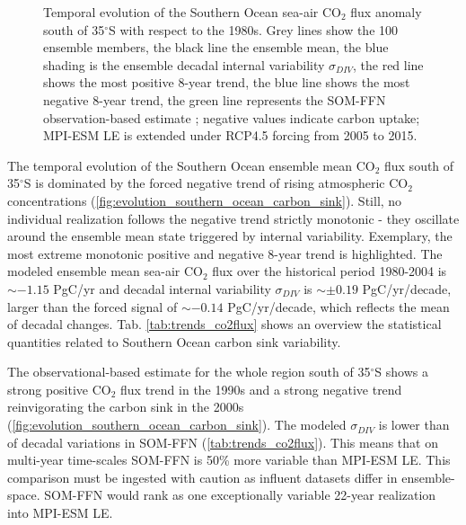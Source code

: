 \clearpage
\begin{figure}[hbt]
        \myfloatalign
        \captionsetup[subfigure]{labelformat=empty,justification=centering}
        \caption{Temporal evolution of the Southern Ocean sea-air CO$_2$ flux anomaly south of 35$^\circ$S with respect to the 1980s. Grey lines show the 100 ensemble members, the black line the ensemble mean, the blue shading is the ensemble decadal internal variability $\sigma_{DIV}$, the red line shows the most  positive 8-year trend, the blue line shows the most negative 8-year trend, the green line represents the \acs{SOM-FFN} observation-based estimate \citep{landschuetzer2015}; negative values indicate carbon uptake; \acs{MPI-ESM LE} is extended under \acs{RCP}4.5 forcing from 2005 to 2015.}\label{fig:evolution_southern_ocean_carbon_sink}
\end{figure}

The temporal evolution of the Southern Ocean ensemble mean CO$_2$ flux south of 35$^\circ$S is dominated by the forced negative trend of rising atmospheric CO$_2$ concentrations (\autoref{fig:evolution_southern_ocean_carbon_sink}). Still, no individual realization follows the negative trend strictly monotonic - they oscillate around the ensemble mean state triggered by internal variability. Exemplary, the most extreme monotonic positive and negative 8-year trend is highlighted. The modeled ensemble mean sea-air CO$_2$ flux over the historical period 1980-2004 is $\sim-1.15$ PgC/yr and decadal internal variability $\sigma_{DIV}$ is $\sim\pm0.19$ PgC/yr/decade, larger than the forced signal of $\sim-0.14$ PgC/yr/decade, which reflects the mean of decadal changes. {\color{RoyalBlue}Tab.} \ref{tab:trends_co2flux} shows an overview the statistical quantities related to Southern Ocean carbon sink variability.\newline

The observational-based estimate for the whole region south of 35$^\circ$S shows a strong positive CO$_2$ flux trend in the 1990s and a strong negative trend reinvigorating the carbon sink in the 2000s \citep{landschuetzer2015} (\autoref{fig:evolution_southern_ocean_carbon_sink}). The modeled $\sigma_{DIV}$ is lower than of decadal variations in \acs{SOM-FFN} (\autoref{tab:trends_co2flux}). This means that on multi-year time-scales \acs{SOM-FFN} is 50\% more variable than \acs{MPI-ESM LE}. This comparison must be ingested with caution as influent datasets differ in ensemble-space. \acs{SOM-FFN} would rank as one exceptionally variable 22-year realization into \acs{MPI-ESM LE}.\newline

